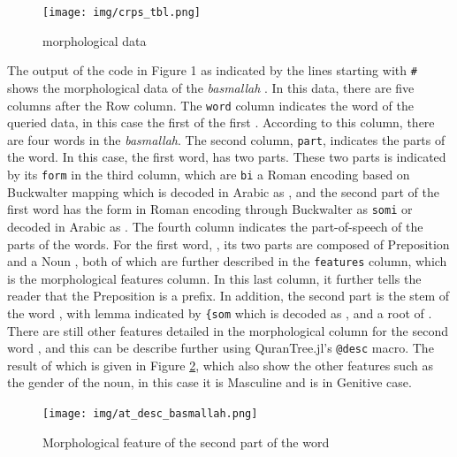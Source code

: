 \begin{figure}[!t]
    \centering
    \texttt{[image: img/crps\_tbl.png]}
    \caption{  morphological data}
    \label{fig:result_crps_tbl}
\end{figure}

The output of the code in Figure 1 as indicated by the lines starting with \texttt{\#} shows the morphological data of the \textit{basmallah} . In this data, there are five columns after the Row column. The \texttt{word} column indicates the word of the queried data, in this case the first   of the first  . According to this column, there are four words in the \textit{basmallah}. The second column, \texttt{part}, indicates the parts of the word. In this case, the first word, has two parts. These two parts is indicated by its \texttt{form} in the third column, which are \texttt{bi} a Roman encoding based on Buckwalter mapping which is decoded in Arabic as , and the second part of the first word has the form in Roman encoding through Buckwalter as \texttt{somi} or decoded in Arabic as . The fourth column indicates the part-of-speech of the parts of the words. For the first word, , its two parts are composed of Preposition  and a Noun , both of which are further described in the \texttt{features} column, which is the morphological features column. In this last column, it further tells the reader that the Preposition  is a prefix. In addition, the second part  is the stem of the word , with lemma indicated by \texttt{\{som} which is decoded as , and a root of . There are still other features detailed in the morphological column for the second word , and this can be describe further using QuranTree.jl's \texttt{@desc} macro. The result of which is given in Figure \ref{fig:result_at_desc_basmallah}, which also show the other features such as the gender of the noun, in this case it is Masculine and is in Genitive case.

\begin{figure}[!t]
    \centering
    \texttt{[image: img/at\_desc\_basmallah.png]}
    \caption{Morphological feature of the second part of the word }
    \label{fig:result_at_desc_basmallah}
\end{figure}


